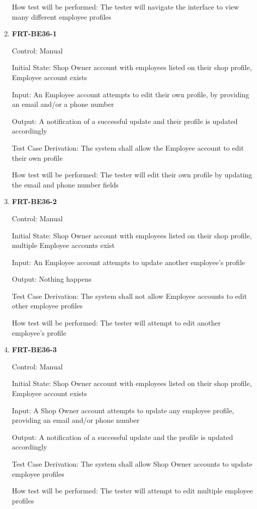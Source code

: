 \documentclass[12pt, titlepage]{article}
\begin{document}
\begin{enumerate}
	      How test will be performed: The tester will navigate the interface to view many different employee
	      profiles

	\item \textbf{FRT-BE36-1}

	      Control: Manual

	      Initial State: Shop Owner account with employees listed on their shop profile, Employee account
	      exists

	      Input: An Employee account attempts to edit their own profile, by providing an email and/or a phone
	      number

	      Output: A notification of a successful update and their profile is updated accordingly

	      Test Case Derivation: The system shall allow the Employee account to edit their own profile

	      How test will be performed: The tester will edit their own profile by updating the email and phone
	      number fields

	\item \textbf{FRT-BE36-2}

	      Control: Manual

	      Initial State: Shop Owner account with employees listed on their shop profile, multiple Employee
	      accounts exist

	      Input: An Employee account attempts to update another employee's profile

	      Output: Nothing happens

	      Test Case Derivation: The system shall not allow Employee accounts to edit other employee profiles

	      How test will be performed: The tester will attempt to edit another employee's profile

	\item \textbf{FRT-BE36-3}

	      Control: Manual

	      Initial State: Shop Owner account with employees listed on their shop profile, Employee account
	      exists

	      Input: A Shop Owner account attempts to update any employee profile, providing an email and/or
	      phone number

	      Output: A notification of a successful update and the profile is updated accordingly

	      Test Case Derivation: The system shall allow Shop Owner accounts to update employee profiles

	      How test will be performed: The tester will attempt to edit multiple employee profiles

\end{enumerate}
\end{document}
